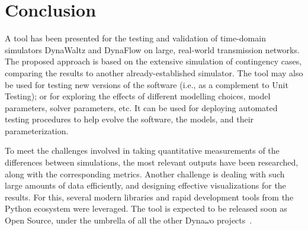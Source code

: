 \documentclass[conference]{IEEEtran}
\begin{document}
\section{Conclusion}

A tool has been presented for the testing and validation of time-domain simulators
DynaWaltz and DynaFlow on large, real-world transmission networks.  The proposed approach
is based on the extensive simulation of contingency cases, comparing the results
to another already-established simulator. The tool may also be used for testing
new versions of the software (i.e., as a complement to Unit Testing); or for
exploring the effects of different modelling choices, model parameters, solver
parameters, etc.  It can be used for deploying automated testing procedures to
help evolve the software, the models, and their parameterization.

To meet the challenges involved in taking quantitative measurements of the
differences between simulations, the most relevant outputs have been researched, along
with the corresponding metrics. Another challenge is dealing with such large
amounts of data efficiently, and designing effective visualizations for the
results. For this, several modern libraries and rapid development
tools from the Python ecosystem were leveraged.  The tool is expected to be released soon as
Open Source, under the umbrella of all the other Dyna$\omega$o projects~\cite{DwoGitRepos}.









\end{document}
